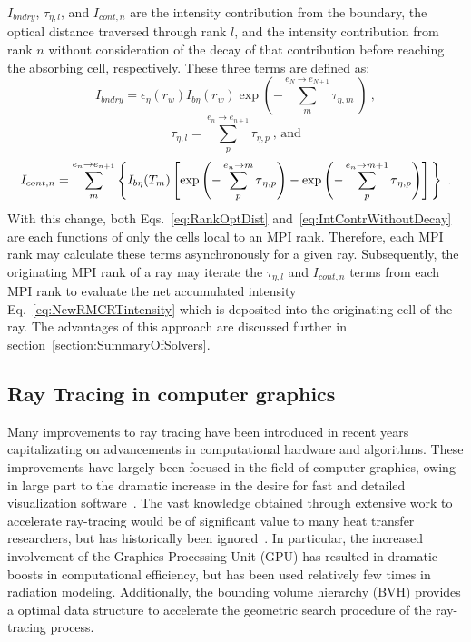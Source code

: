 $I_{bndry}$, $\tau{}_{\eta{},l}$, and $I_{cont,n}$ are the intensity contribution from the boundary, the optical distance traversed through rank $l$, and the intensity contribution from rank $n$ without consideration of the decay of that contribution before reaching the absorbing cell, respectively. These three terms are defined as:
\begin{equation}
    I_{bndry}=\epsilon{}_\eta{}(r_w)I_{b\eta{}}(r_w)\exp{\left(-\sum_{m}^{e_N\rightarrow{}e_{N+1}}\tau{}_{\eta{},m}~\right)}~,
    \label{eq:Ibndry}
\end{equation}
\begin{equation}
    \tau{}_{\eta{},l}=\sum_{p}^{e_n\rightarrow{}e_{n+1}}\tau{}_{\eta{},p}~\text{, and}
    \label{eq:RankOptDist}
\end{equation}
\begin{equation}
    I_{cont,n}=\sum_{m}^{e_n\rightarrow{}e_{n+1}}\left\{ I_{b\eta}(T_m)\left[ \exp{\left(-\sum_{p}^{e_n\rightarrow{}m}\tau{}_{\eta,p}\right)}
    -\exp{\left(-\sum_{p}^{e_n\rightarrow{}m+1}\tau{}_{\eta{},p}\right)} \vphantom{\frac12}\right] \vphantom{\frac12}\right\}~.
    \label{eq:IntContrWithoutDecay}
\end{equation}
With this change, both Eqs.~\ref{eq:RankOptDist} and~\ref{eq:IntContrWithoutDecay} are each functions of only the cells local to an MPI rank. Therefore, each MPI rank may calculate these terms asynchronously for a given ray. Subsequently, the originating MPI rank of a ray may iterate the $\tau{}_{\eta,l}$ and $I_{cont,n}$ terms from each MPI rank to evaluate the net accumulated intensity Eq.~\ref{eq:NewRMCRTintensity} which is deposited into the originating cell of the ray. The advantages of this approach are discussed further in section~\ref{section:SummaryOfSolvers}.


\subsection{Ray Tracing in computer graphics}\label{section:ComputerGraphicsTracing}
Many improvements to ray tracing have been introduced in recent years capitalizating on advancements in computational hardware and algorithms.
These improvements have largely been focused in the field of computer graphics, owing in large part to the dramatic increase in the desire for fast and detailed visualization software~\cite{Gupta2020CUDAComputing}. 
The vast knowledge obtained through extensive work to accelerate ray-tracing would be of significant value to many heat transfer researchers, but has historically been ignored~\cite{Howell2021TheTransfer}. 
In particular, the increased involvement of the Graphics Processing Unit (GPU) has resulted in dramatic boosts in computational efficiency, but has been used relatively few times in radiation modeling.
Additionally, the bounding volume hierarchy (BVH) provides a optimal data structure to accelerate the geometric search procedure of the ray-tracing process.

